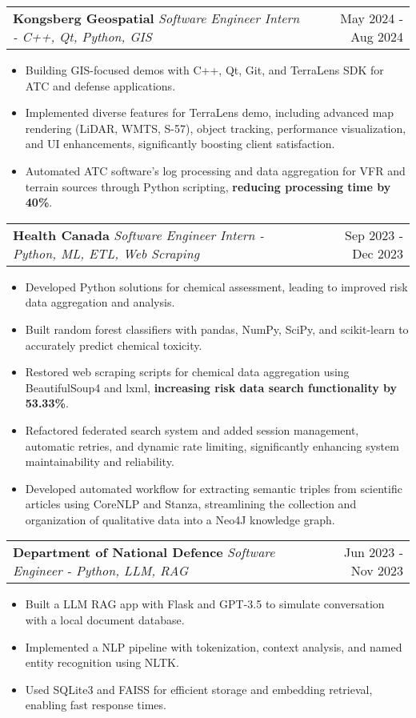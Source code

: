 \documentclass[letterpaper,11pt]{article}
\makeatletter
\newcommand{\resumeItem}[1]{
  \item\small{
    {#1 \vspace{-2pt}}
  }
}
\newcommand{\resumeSubheading}[3]{
    \item
    \begin{tabular*}{0.97\textwidth}[t]{l@{\extracolsep{\fill}}r}
      \textbf{#1} \textbar \textit{ #2} & #3 \\
    \end{tabular*}\vspace{-4.5pt}
}
\newcommand{\resumeItemListStart}{\begin{itemize}}
\newcommand{\resumeItemListEnd}{\end{itemize}\vspace{-5pt}}
\makeatother
\begin{document}
      \resumeSubheading
      {Kongsberg Geospatial}{Software Engineer Intern - C++, Qt, Python, GIS}{May 2024 - Aug 2024}
      \resumeItemListStart
      \resumeItem{Building GIS-focused demos with C++, Qt, Git, and TerraLens SDK for ATC and defense applications.}
      \resumeItem{Implemented diverse features for TerraLens demo, including advanced map rendering (LiDAR, WMTS, S-57), object tracking, performance visualization, and UI enhancements, significantly boosting client satisfaction.}
        \resumeItem{Automated ATC software's log processing and data aggregation for VFR and terrain sources through Python scripting, \textbf{reducing processing time by 40\%}.}
      \resumeItemListEnd

    \resumeSubheading
      {Health Canada}{Software Engineer Intern - Python, ML, ETL, Web Scraping}{Sep 2023 - Dec 2023}
      \resumeItemListStart
        \resumeItem{Developed Python solutions for chemical assessment, leading to improved risk data aggregation and analysis.}
        \resumeItem{Built random forest classifiers with pandas, NumPy, SciPy, and scikit-learn to accurately predict chemical toxicity.}
        \resumeItem{Restored web scraping scripts for chemical data aggregation using BeautifulSoup4 and lxml, \textbf{increasing risk data search functionality by 53.33\%}.}
        \resumeItem{Refactored federated search system and added session management, automatic retries, and dynamic rate limiting, significantly enhancing system maintainability and reliability.}
        \resumeItem{Developed automated workflow for extracting semantic triples from scientific articles using CoreNLP and Stanza, streamlining the collection and organization of qualitative data into a Neo4J knowledge graph.}
      \resumeItemListEnd

    \resumeSubheading
    {Department of National Defence}{Software Engineer - Python, LLM, RAG}{Jun 2023 - Nov 2023}
      \resumeItemListStart
        \resumeItem{Built a LLM RAG app with Flask and GPT-3.5 to simulate conversation with a local document database.}
        \resumeItem{Implemented a NLP pipeline with tokenization, context analysis, and named entity recognition using NLTK.}
        \resumeItem{Used SQLite3 and FAISS for efficient storage and embedding retrieval, enabling fast response times.}
      \resumeItemListEnd
\end{document}
